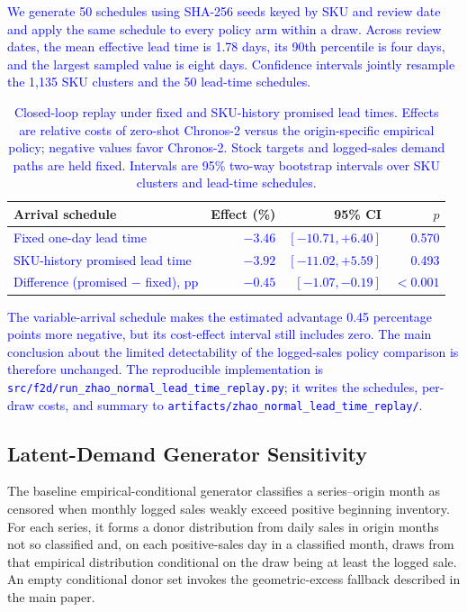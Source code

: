 \documentclass[msom,dblanonrev]{informs4}
\newcommand{\add}[1]{\textcolor{blue}{#1}}
\begin{document}
\add{We generate 50 schedules using SHA-256 seeds keyed by SKU and review date and apply the same schedule to every policy arm within a draw. Across review dates, the mean effective lead time is 1.78 days, its 90th percentile is four days, and the largest sampled value is eight days. Confidence intervals jointly resample the 1{,}135 SKU clusters and the 50 lead-time schedules.}

\begin{table}[htbp]
\centering
\caption{\add{Closed-loop replay under fixed and SKU-history promised lead times. Effects are relative costs of zero-shot Chronos-2 versus the origin-specific empirical policy; negative values favor Chronos-2. Stock targets and logged-sales demand paths are held fixed. Intervals are 95\% two-way bootstrap intervals over SKU clusters and lead-time schedules.}}\label{tab:oa-promised-lead-time}
\small
\begin{tabular}{lrrr}
\toprule
\textbf{Arrival schedule} & \textbf{Effect (\%)} & \textbf{95\% CI} & \textbf{$p$} \\
\midrule
\add{Fixed one-day lead time} & \add{$-3.46$} & \add{$[-10.71,+6.40]$} & \add{0.570} \\
\add{SKU-history promised lead time} & \add{$-3.92$} & \add{$[-11.02,+5.59]$} & \add{0.493} \\
\add{Difference (promised $-$ fixed), pp} & \add{$-0.45$} & \add{$[-1.07,-0.19]$} & \add{$<0.001$} \\
\bottomrule
\end{tabular}
\end{table}

\add{The variable-arrival schedule makes the estimated advantage 0.45 percentage points more negative, but its cost-effect interval still includes zero. The main conclusion about the limited detectability of the logged-sales policy comparison is therefore unchanged. The reproducible implementation is \texttt{src/f2d/run\_zhao\_normal\_lead\_time\_replay.py}; it writes the schedules, per-draw costs, and summary to \texttt{artifacts/zhao\_normal\_lead\_time\_replay/}.}

\subsection{Latent-Demand Generator Sensitivity}\label{oa:dgp}

The baseline empirical-conditional generator classifies a series--origin month as censored when monthly logged sales weakly exceed positive beginning inventory.
For each series, it forms a donor distribution from daily sales in origin months not so classified and, on each positive-sales day in a classified month, draws from that empirical distribution conditional on the draw being at least the logged sale.
An empty conditional donor set invokes the geometric-excess fallback described in the main paper.
\end{document}
